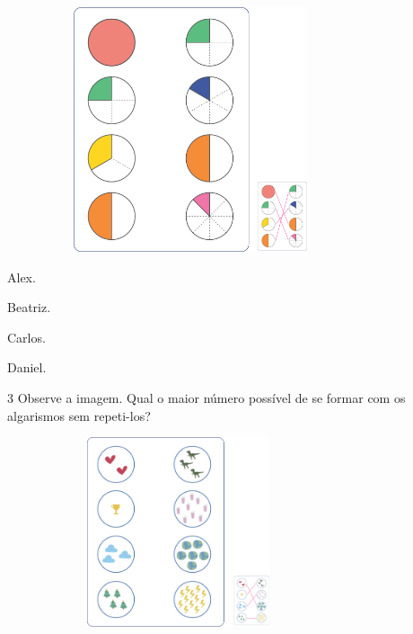 \begin{escolha}
\begin{escolha}
\includegraphics[width=4.25000in,height=2.83333in]{media/image106.png}


\begin{minipage}{.5\textwidth}
\begin{escolha}
\item Alex.

\item Beatriz.

\item Carlos.

\item Daniel.
\end{escolha}
\end{minipage}

\num{3} Observe a imagem. Qual o maior número possível de se formar com os
algarismos sem repeti-los?

\includegraphics[width=3.96880in,height=2.19793in]{media/image107.png}


\end{escolha}
\end{escolha}
